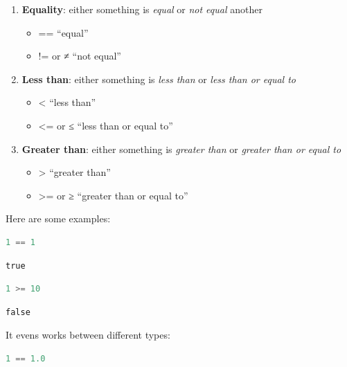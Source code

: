 \documentclass[
  notoc %
]{tufte-book}
\providecommand{\tightlist}{%
  \setlength{\itemsep}{0pt}\setlength{\parskip}{0pt}
}
\begin{document}
\begin{enumerate}
\def\labelenumi{\arabic{enumi}.}
\tightlist
\item
  \textbf{Equality}: either something is \emph{equal} or \emph{not
  equal} another

  \begin{itemize}
  \tightlist
  \item
    == ``equal''
  \item
    != or ≠ ``not equal''
  \end{itemize}
\item
  \textbf{Less than}: either something is \emph{less than} or \emph{less
  than or equal to}

  \begin{itemize}
  \tightlist
  \item
    \textless{} ``less than''
  \item
    \textless= or ≤ ``less than or equal to''
  \end{itemize}
\item
  \textbf{Greater than}: either something is \emph{greater than} or
  \emph{greater than or equal to}

  \begin{itemize}
  \tightlist
  \item
    \textgreater{} ``greater than''
  \item
    \textgreater= or ≥ ``greater than or equal to''
  \end{itemize}
\end{enumerate}

Here are some examples:

\begin{lstlisting}[language=Julia]
1 == 1
\end{lstlisting}

\begin{lstlisting}[language=Output]
true
\end{lstlisting}

\begin{lstlisting}[language=Julia]
1 >= 10
\end{lstlisting}

\begin{lstlisting}[language=Output]
false
\end{lstlisting}

It evens works between different types:

\begin{lstlisting}[language=Julia]
1 == 1.0
\end{lstlisting}
\end{document}
